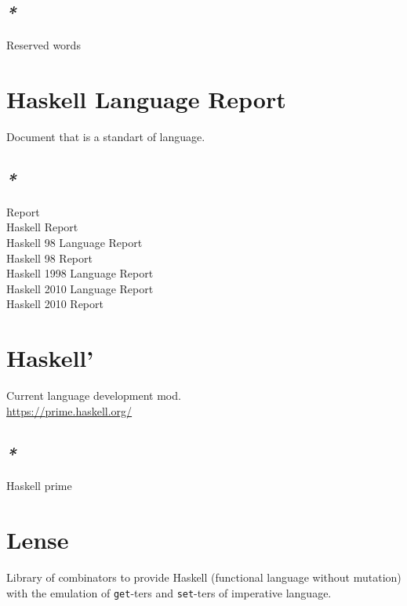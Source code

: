 \documentclass[a4paper,14pt,oneside]{book}
\begin{document}
\subsection{\emph{*}}
\label{sec:orgb49df38}
\label{org2ac63f6}Reserved words\\

\section{\label{org4d6ae3e}Haskell Language Report}
\label{sec:orgc8c437d}
Document that is a standart of language.\\

\subsection{\emph{*}}
\label{sec:org9116c82}
\label{orgbc07fc2}Report\\
\label{org09db4e7}Haskell Report\\
\label{org50a3cc2}Haskell 98 Language Report\\
\label{orgea3c74c}Haskell 98 Report\\
\label{orgc64123c}Haskell 1998 Language Report\\
\label{orgc52f100}Haskell 2010 Language Report\\
\label{orgebcb94b}Haskell 2010 Report\\

\section{\label{org73edb79}Haskell'}
\label{sec:orgae6cde4}
Current language development mod.\\

\url{https://prime.haskell.org/}\\

\subsection{\emph{*}}
\label{sec:org4a2e215}

\label{orgb951d5c}Haskell prime\\

\section{\label{org31900c8}Lense}
\label{sec:org4f4113b}
Library of combinators to provide Haskell (functional language without mutation) with the emulation of \texttt{get}-ters and \texttt{set}-ters of imperative language.\\
\end{document}
